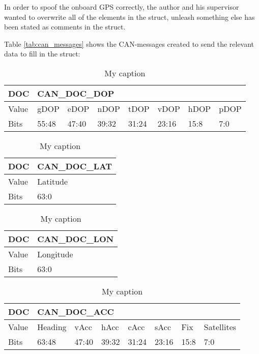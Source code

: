 In order to spoof the onboard GPS correctly, the author and his supervisor wanted to overwrite all of the elements in the struct, unleash something else has been stated as comments in the struct.



Table \ref{tab:can_messages} shows the CAN-messages created to send the relevant data to fill in the struct:

\begin{table}[]
\centering
\caption{My caption}
\label{my-label}
\begin{tabular}{@{}|l|l|l|l|l|l|l|l|@{}}
\toprule
DOC   & \multicolumn{7}{l|}{CAN\_DOC\_DOP}                  \\ \midrule
Value & gDOP  & eDOP  & nDOP  & tDOP  & vDOP  & hDOP & pDOP \\ \midrule
Bits  & 55:48 & 47:40 & 39:32 & 31:24 & 23:16 & 15:8 & 7:0  \\ \bottomrule
\end{tabular}
\end{table}

\begin{table}[]
\centering
\caption{My caption}
\label{my-label}
\begin{tabular}{@{}|l|l|@{}}
\toprule
DOC   & CAN\_DOC\_LAT \\ \midrule
Value & Latitude      \\ \midrule
Bits  & 63:0          \\ \bottomrule
\end{tabular}
\end{table}

\begin{table}[]
\centering
\caption{My caption}
\label{my-label}
\begin{tabular}{@{}|l|l|@{}}
\toprule
DOC   & CAN\_DOC\_LON \\ \midrule
Value & Longitude     \\ \midrule
Bits  & 63:0          \\ \bottomrule
\end{tabular}
\end{table}

\begin{table}[]
\centering
\caption{My caption}
\label{my-label}
\begin{tabular}{@{}|l|l|l|l|l|l|l|l|@{}}
\toprule
DOC   & \multicolumn{7}{l|}{CAN\_DOC\_ACC}                          \\ \midrule
Value & Heading & vAcc  & hAcc  & cAcc  & sAcc  & Fix  & Satellites \\ \midrule
Bits  & 63:48   & 47:40 & 39:32 & 31:24 & 23:16 & 15:8 & 7:0        \\ \bottomrule
\end{tabular}
\end{table}


